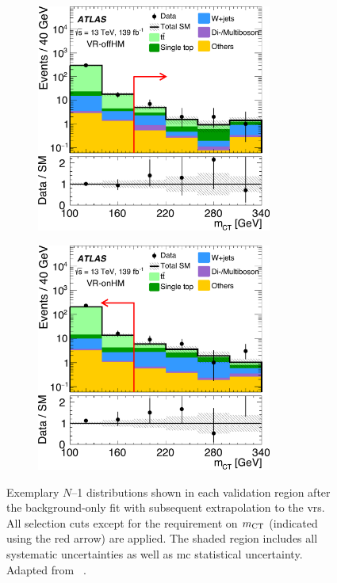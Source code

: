 \begin{figure}
	\begin{subfigure}[b]{0.5\linewidth}
		\centering\includegraphics[width=0.85\textwidth]{fig_03f_yellow}
	\end{subfigure}\hfill
	\begin{subfigure}[b]{0.5\linewidth}
		\centering\includegraphics[width=0.85\textwidth]{fig_03e_yellow}
	\end{subfigure}\hfill

	\caption{Exemplary $N$--1 distributions shown in each validation region after the background-only fit with subsequent extrapolation to the \glspl{vr}. All selection cuts except for the requirement on $m_{\textrm{CT}}$ (indicated using the red arrow) are applied. The shaded region includes all systematic uncertainties as well as \gls{mc} statistical uncertainty. Adapted from ~\cite{SUSY-2019-08}.}
	\label{fig:VR_distributions_postfit}
\end{figure}

